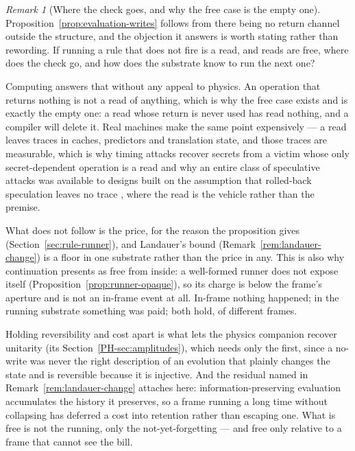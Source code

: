 \documentclass[11pt,a4paper]{article}
\theoremstyle{remark}\newtheorem{remark}[definition]{Remark}
\begin{document}
\begin{remark}[Where the check goes, and why the free case is the empty one]\label{rem:evaluation-writes}
Proposition~\ref{prop:evaluation-writes} follows from there being no return channel outside the
structure, and the objection it answers is worth stating rather than rewording. If running a rule
that does not fire is a read, and reads are free, where does the check go, and how does the substrate
know to run the next one?

Computing answers that without any appeal to physics. An operation that returns nothing is
not a read of anything, which is why the free case exists and is exactly the empty one: a read whose
return is never used has read nothing, and a compiler will delete it. Real machines make the same
point expensively --- a read leaves traces in caches, predictors and translation state, and those
traces are measurable, which is why timing attacks recover secrets from a victim whose only secret-dependent operation is a
read \citep{osvik2006} and why an entire class of speculative attacks was available to designs built on the assumption that rolled-back
speculation leaves no trace \citep{kocher2019}, where the read is the vehicle rather than the premise.

What does not follow is the
price, for the reason the proposition gives (Section~\ref{sec:rule-runner}), and Landauer's bound
(Remark~\ref{rem:landauer-change}) is a floor in one substrate rather than the price in any. This is also why continuation presents as free from inside: a
well-formed runner does not expose itself (Proposition~\ref{prop:runner-opaque}), so its charge is
below the frame's aperture and is not an in-frame event at all. In-frame nothing happened; in the
running substrate something was paid; both hold, of different frames.

Holding reversibility and cost apart
is what lets the physics companion recover unitarity (its Section~\ref{PH-sec:amplitudes}), which needs only the first, since a
no-write was never the right description of an evolution that plainly changes the state and is
reversible because it is injective. And the residual named in Remark~\ref{rem:landauer-change}
attaches here: information-preserving evaluation accumulates the history it preserves, so a frame
running a long time without collapsing has deferred a cost into retention rather than escaping one.
What is free is not the running, only the not-yet-forgetting --- and free only relative to a frame
that cannot see the bill.
\end{remark}
\end{document}
